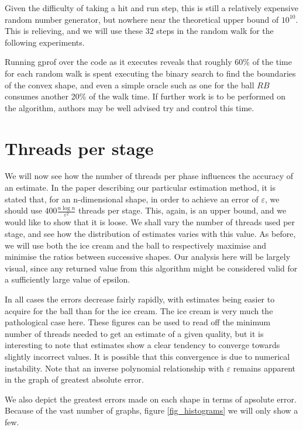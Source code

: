 Given the difficulty of taking a hit and run step, this is still a relatively expensive random number generator, but nowhere near the theoretical upper bound of $10^{10}$. This is relieving, and we will use these 32 steps in the random walk for the following experiments.

Running gprof over the code as it executes reveals that roughly 60\% of the time for each random walk is spent executing the binary search to find the boundaries of the convex shape, and even a simple oracle such as one for the ball $RB$ consumes another 20\% of the walk time. If further work is to be performed on the algorithm, authors may be well advised try and control this time.

\section{Threads per stage}\label{sec_error}

We will now see how the number of threads per phase influences the accuracy of an estimate. In the paper describing our particular estimation method, it is stated that, for an n-dimensional shape, in order to achieve an error of $\varepsilon$, we should use $400\frac{n\log n}{\varepsilon^2}$ threads per stage. This, again, is an upper bound, and we would like to show that it is loose. We shall vary the number of threads used per stage, and see how the distribution of estimates varies with this value. As before, we will use both the ice cream and the ball to respectively maximise and minimise the ratios between successive shapes. Our analysis here will be largely visual, since any returned value from this algorithm might be considered valid for a sufficiently large value of epsilon.

In all cases the errors decrease fairly rapidly, with estimates being easier to acquire for the ball than for the ice cream. The ice cream is very much the pathological case here. These figures can be used to read off the minimum number of threads needed to get an estimate of a given quality, but it is interesting to note that estimates show a clear tendency to converge towards slightly incorrect values. It is possible that this convergence is due to numerical instability. Note that an inverse polynomial relationship with $\varepsilon$ remains apparent in the graph of greatest absolute error.

We also depict the greatest errors made on each shape in terms of apsolute error. Because of the vast number of graphs, figure \ref{fig_histograms} we will only show a few.

